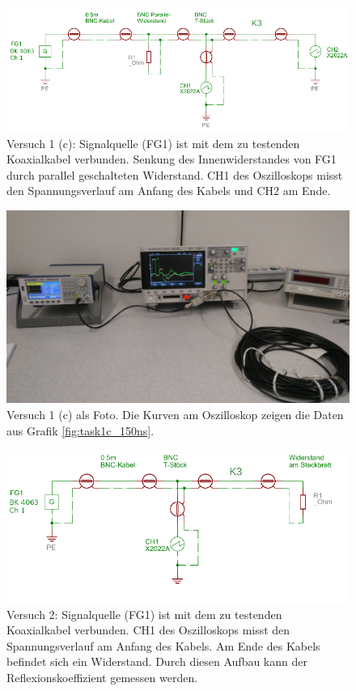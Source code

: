\documentclass{article}
\begin{document}
\begin{figure}[H]
\centering
\caption{Versuch 1 (c): Signalquelle (FG1) ist mit dem zu testenden Koaxialkabel verbunden. Senkung des Innenwiderstandes von FG1 durch parallel geschalteten Widerstand. CH1 des Oszilloskops misst den Spannungsverlauf am Anfang des Kabels und CH2 am Ende.}
\label{fig:anordnung_task1c}
\includegraphics[scale=2]{task1c.png}
\end{figure}



\begin{figure}[H]
\centering
\caption{Versuch 1 (c) als Foto. Die Kurven am Oszilloskop zeigen die Daten aus Grafik \ref{fig:task1c_150ns}.}
\label{fig:foto_task1b}
\includegraphics[scale=0.6]{foto_task1c.jpg}
\end{figure}


\begin{figure}[H]
\centering
\caption{Versuch 2: Signalquelle (FG1) ist mit dem zu testenden Koaxialkabel verbunden. CH1 des Oszilloskops misst den Spannungsverlauf am Anfang des Kabels. Am Ende des Kabels befindet sich ein Widerstand. Durch diesen Aufbau kann der Reflexionskoeffizient gemessen werden.}
\label{fig:anordnung_task2}
\includegraphics[scale=2]{task2.png}
\end{figure}
\end{document}
